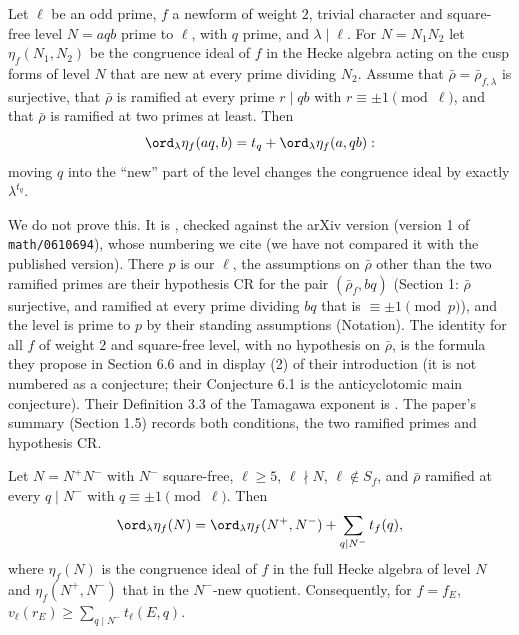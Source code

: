 \begin{theorem}\label{thm:modgalrep:pollack-weston}
Let $\ell$ be an odd prime, $f$ a newform of weight $2$, trivial character and square-free level $N=aqb$ prime to $\ell$, with $q$ prime, and $\lambda\mid\ell$. For $N=N_1N_2$ let
$\eta_f(N_1,N_2)$ be the congruence ideal of $f$ in the Hecke algebra acting on the cusp forms of level $N$ that are new at every prime dividing $N_2$. Assume that $\bar\rho=\bar\rho_{f,\lambda}$
is surjective, that $\bar\rho$ is ramified at every prime $r\mid qb$ with $r\equiv\pm1\pmod\ell$, and that $\bar\rho$ is ramified at two primes at least. Then
\[
\ord_\lambda\eta_f(aq,b)=t_q+\ord_\lambda\eta_f(a,qb):
\]
moving $q$ into the ``new'' part of the level changes the congruence ideal by exactly $\lambda^{t_q}$.
\end{theorem}

We do not prove this. It is \cite[Theorem 6.11]{PollackWeston11}, checked against the arXiv version (version 1 of
\texttt{math/0610694}), whose numbering we cite (we have not compared it with the
published version). There $p$ is our $\ell$, the assumptions on $\bar\rho$ other than the two ramified primes are their hypothesis CR for the pair $(\bar\rho_f,bq)$ (Section 1:
$\bar\rho$ surjective, and ramified at every prime dividing $bq$ that is $\equiv\pm1\pmod p$), and the level is prime to $p$ by their standing assumptions (Notation). The identity
for all $f$ of weight $2$ and square-free level, with no hypothesis on $\bar\rho$, is the formula they propose in Section 6.6 and in display (2) of their introduction (it is not
numbered as a conjecture; their Conjecture 6.1 is the anticyclotomic main conjecture). Their Definition 3.3 of the Tamagawa exponent is .
The paper's summary (Section 1.5) records both conditions, the two ramified primes and hypothesis CR.

\begin{theorem}\label{thm:modgalrep:kim-ota}
Let $N=N^+N^-$ with $N^-$ square-free, $\ell\ge5$, $\ell\nmid N$, $\ell\notin S_f$, and $\bar\rho$ ramified at every $q\mid N^-$ with $q\equiv\pm1\pmod\ell$. Then
\[
\ord_\lambda\eta_f(N)=\ord_\lambda\eta_f(N^+,N^-)+\sum_{q\mid N^-}t_f(q),
\]
where $\eta_f(N)$ is the congruence ideal of $f$ in the full Hecke algebra of level $N$ and $\eta_f(N^+,N^-)$ that in the $N^-$-new quotient. Consequently, for $f=f_E$,
$v_\ell(r_E)\ge\sum_{q\mid N^-}t_\ell(E,q)$.
\end{theorem}

